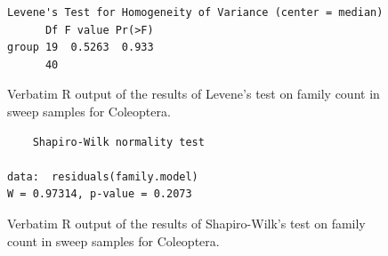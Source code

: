 \documentclass[10pt,letterpaper,twocolumn]{article}
\begin{document}
\begin{figure}[h]
	\lstset{numbers=left}
	\lstset{xleftmargin=5mm,framexleftmargin=5mm}
	\begin{lstlisting}
Levene's Test for Homogeneity of Variance (center = median)
      Df F value Pr(>F)
group 19  0.5263  0.933
      40               
	\end{lstlisting}
	\caption{Verbatim R output of the results of Levene's test on family count in sweep samples for Coleoptera.}
	\label{fig:sweep_coleoptera_family_levene}
	\smallskip
	\nointerlineskip
	\hrulefill
\end{figure}

\begin{figure}[h]
	\lstset{numbers=left}
	\lstset{xleftmargin=5mm,framexleftmargin=5mm}
	\begin{lstlisting}
	Shapiro-Wilk normality test

data:  residuals(family.model)
W = 0.97314, p-value = 0.2073
	\end{lstlisting}
	\caption{Verbatim R output of the results of Shapiro-Wilk's test on family count in sweep samples for Coleoptera.}
	\label{fig:sweep_coleoptera_family_shapiro}
	\smallskip
	\nointerlineskip
	\hrulefill
\end{figure}
\end{document}
